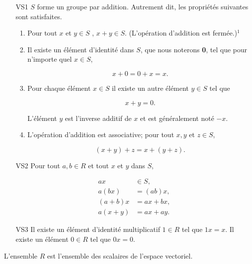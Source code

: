 \documentclass[11pt,twoside,a4paper]{article}
\begin{document}
\begin{enumerate}
  \item[VS1] $S$ forme un groupe par addition. Autrement dit, les propriétés suivantes sont satisfaites.
  
  \begin{enumerate}
    \item Pour tout $x$ et $y \in S$ , $x + y \in S$. (L'opération d'addition est fermée.)$^1$
    \item Il existe un élément d'identité dans $S$, que nous noterons \textbf{0}, tel que pour n'importe quel $x \in S$,
    
    \begin{equation*}
      x + 0 = 0 + x = x.
    \end{equation*}

    \item Pour chaque élément $x \in S$ il existe un autre élément $y \in S$ tel que
    
    \begin{equation*}
      x + y = 0.
    \end{equation*}

    \noindent
    L'élément $y$ est l'inverse additif de $x$ et est généralement noté $-x$.
    \item L'opération d'addition est associative; pour tout $x, y$ et $z \in S$,
    
    \begin{equation*}
      (x + y) + z = x + (y + z).
    \end{equation*}
  \end{enumerate}

  \item[VS2] Pour tout $a, b \in R$ et tout $x$ et $y$ dans $S$,
  
  \begin{align*}
    ax &\in S, \\
    a(bx) &= (ab)x, \\
    (a+b)x &= ax + bx, \\
    a(x+y) &= ax + ay.
  \end{align*}

  \item[VS3] Il existe un élément d'identité multiplicatif $1 \in R$ tel que $1x = x$. Il existe un élément $0 \in R$ tel que $0x = 0$.
  \vspace{4mm}
\end{enumerate}

\noindent
L'ensemble $R$ est l'ensemble des scalaires de l'espace vectoriel.
\vspace{3mm}
\end{document}
